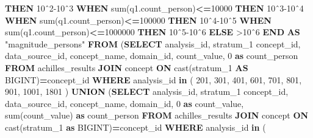 \documentclass[
]{book}
\newenvironment{Shaded}{\begin{snugshade}}{\end{snugshade}}
\newcommand{\ControlFlowTok}[1]{\textcolor[rgb]{0.13,0.29,0.53}{\textbf{#1}}}
\newcommand{\DecValTok}[1]{\textcolor[rgb]{0.00,0.00,0.81}{#1}}
\newcommand{\FunctionTok}[1]{\textcolor[rgb]{0.00,0.00,0.00}{#1}}
\newcommand{\KeywordTok}[1]{\textcolor[rgb]{0.13,0.29,0.53}{\textbf{#1}}}
\newcommand{\NormalTok}[1]{#1}
\newcommand{\OperatorTok}[1]{\textcolor[rgb]{0.81,0.36,0.00}{\textbf{#1}}}
\newcommand{\OtherTok}[1]{\textcolor[rgb]{0.56,0.35,0.01}{#1}}
\newcommand{\StringTok}[1]{\textcolor[rgb]{0.31,0.60,0.02}{#1}}
\begin{document}
\begin{Shaded}
\begin{Highlighting}[]
          \ControlFlowTok{THEN} \StringTok{\textquotesingle{}10ˆ2{-}10ˆ3\textquotesingle{}}
        \ControlFlowTok{WHEN} \FunctionTok{sum}\NormalTok{(q1.count\_person)}\OperatorTok{\textless{}=}\DecValTok{10000}
          \ControlFlowTok{THEN} \StringTok{\textquotesingle{}10ˆ3{-}10ˆ4\textquotesingle{}}
        \ControlFlowTok{WHEN} \FunctionTok{sum}\NormalTok{(q1.count\_person)}\OperatorTok{\textless{}=}\DecValTok{100000}
          \ControlFlowTok{THEN} \StringTok{\textquotesingle{}10ˆ4{-}10ˆ5\textquotesingle{}}
        \ControlFlowTok{WHEN} \FunctionTok{sum}\NormalTok{(q1.count\_person)}\OperatorTok{\textless{}=}\DecValTok{1000000}
          \ControlFlowTok{THEN} \StringTok{\textquotesingle{}10ˆ5{-}10ˆ6\textquotesingle{}}
        \ControlFlowTok{ELSE} \StringTok{\textquotesingle{}\textgreater{}10ˆ6\textquotesingle{}}
    \ControlFlowTok{END} \KeywordTok{AS} \OtherTok{"magnitude\_persons"}
\KeywordTok{FROM}\NormalTok{ (}\KeywordTok{SELECT}\NormalTok{ analysis\_id,}
\NormalTok{             stratum\_1 concept\_id,}
\NormalTok{             data\_source\_id,}
\NormalTok{             concept\_name,}
\NormalTok{             domain\_id,}
\NormalTok{             count\_value, }\DecValTok{0} \KeywordTok{as}\NormalTok{ count\_person}
    \KeywordTok{FROM}\NormalTok{ achilles\_results}
    \KeywordTok{JOIN}\NormalTok{ concept}
      \KeywordTok{ON} \FunctionTok{cast}\NormalTok{(stratum\_1 }\KeywordTok{AS}\NormalTok{ BIGINT)}\OperatorTok{=}\NormalTok{concept\_id}
    \KeywordTok{WHERE}
\NormalTok{      analysis\_id }\KeywordTok{in}\NormalTok{ (}
        \DecValTok{201}\NormalTok{, }\DecValTok{301}\NormalTok{, }\DecValTok{401}\NormalTok{, }\DecValTok{601}\NormalTok{, }\DecValTok{701}\NormalTok{, }\DecValTok{801}\NormalTok{, }\DecValTok{901}\NormalTok{, }\DecValTok{1001}\NormalTok{,}
        \DecValTok{1801}
\NormalTok{      )}
    \KeywordTok{UNION}\NormalTok{ (}\KeywordTok{SELECT}\NormalTok{  analysis\_id,}
\NormalTok{                   stratum\_1 concept\_id,}
\NormalTok{                   data\_source\_id,}
\NormalTok{                   concept\_name,}
\NormalTok{                   domain\_id,}
                   \DecValTok{0} \KeywordTok{as}\NormalTok{ count\_value,}
                   \FunctionTok{sum}\NormalTok{(count\_value) }\KeywordTok{as}\NormalTok{ count\_person}
            \KeywordTok{FROM}\NormalTok{  achilles\_results}
            \KeywordTok{JOIN}\NormalTok{ concept}
              \KeywordTok{ON} \FunctionTok{cast}\NormalTok{(stratum\_1 }\KeywordTok{as}\NormalTok{ BIGINT)}\OperatorTok{=}\NormalTok{concept\_id}
            \KeywordTok{WHERE}
\NormalTok{              analysis\_id }\KeywordTok{in}\NormalTok{ (}

\end{Highlighting}
\end{Shaded}
\end{document}
